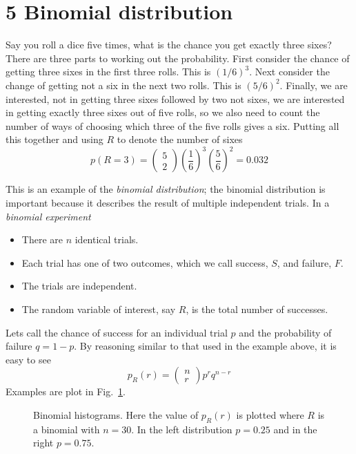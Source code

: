 \documentclass[11pt,a4paper]{scrartcl}
\begin{document}
\section*{5 Binomial distribution}

Say you roll a dice five times, what is the chance you get exactly
three sixes? There are three parts to working out the
probability. First consider the chance of getting three sixes in the
first three rolls. This is $(1/6)^3$. Next consider the change of
getting not a six in the next two rolls. This is $(5/6)^2$. Finally,
we are interested, not in getting three sixes followed by two not
sixes, we are interested in getting exactly three sixes out of five
rolls, so we also need to count the number of ways of choosing which
three of the five rolls gives a six. Putting all this together and using $R$ to denote the number of sixes 
\begin{equation}
p(R=3)=\left(\begin{array}{c}5\\2\end{array}\right)\left(\frac{1}{6}\right)^3\left(\frac{5}{6}\right)^2=0.032
\end{equation}

This is an example of the \textsl{binomial distribution}; the binomial
distribution is important because it describes the result of multiple
independent trials. In a \textsl{binomial experiment}  
\begin{itemize}
\item There are $n$ identical trials.
\item Each trial has one of two outcomes, which we call success, $S$,
  and failure, $F$.
\item The trials are independent.
\item The random variable of interest, say $R$, is the total number of successes.
\end{itemize}
Lets call the chance of success for an individual trial $p$ and the
probability of failure $q=1-p$. By reasoning similar to that used in
the example above, it is easy to see
\begin{equation}
p_R(r)=\left(\begin{array}{c}n\\r\end{array}\right)p^rq^{n-r}
\end{equation}
Examples are plot in Fig.~\ref{fig_binomial}.

\begin{figure}[htb]
\begin{center}

\end{center}
\caption{Binomial histograms. Here the value of $p_R(r)$ is plotted where $R$ is a binomial with $n=30$. In the left distribution $p=0.25$ and in the right $p=0.75$.\label{fig_binomial}}
\end{figure}
\end{document}
